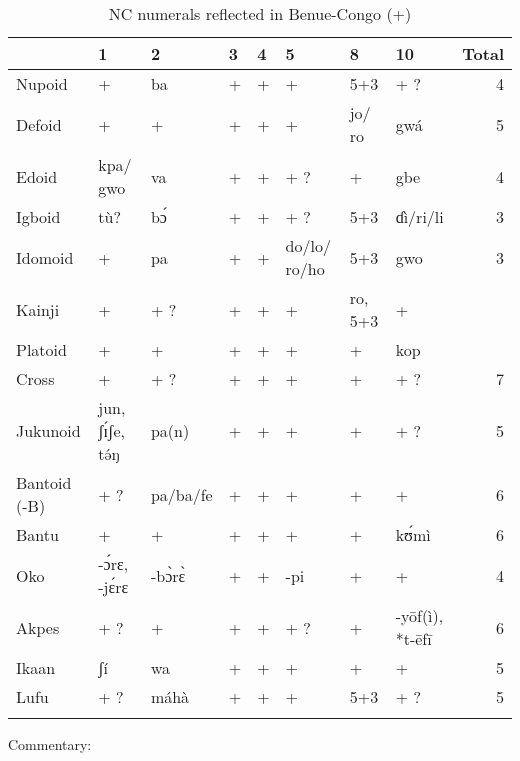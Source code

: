 \begin{table}
\caption{\label{tab:5:1}NC numerals reflected in Benue-Congo (+)}
\begin{tabularx}{\textwidth}{l QlllQlQr}
\lsptoprule
& {1} & {2} & {3} & {4} & {5} & {8} & {10} & {Total}\\
\midrule
Nupoid & {+} & {ba} & {+} & {+} & {+} & {5+3} & {+} ? & {4}\\
Defoid & {+} & {+} & {+} & {+} & {+} & {jo/} {ro} & {gwá} & {5}\\
Edoid & {kpa/} {gwo} & {va} & {+} & {+} & {+} ? & {+} & {gbe} & {4}\\
Igboid & {tù?} & {b{\'{ɔ}}} & {+} & {+} & {+} ? & {5+3} & {ɗì/ri/li} & {\color{lsMidBlue}3}\\
Idomoid & {+} & {pa} & {+} & {+} & {do/lo/ ro/ho} & {5+3} & {gwo} & {\color{lsMidBlue}3}\\
Kainji & {+} & {+} ? & {+} & {+} & {+} & {ro,} {5+3} & {+} & \color{lsLightWine}{6}\\
Platoid & {+} & {+} & {+} & {+} & {+} & {+} & {kop} & \color{lsLightWine}{6}\\
Cross & {+} & {+} ? & {+} & {+} & {+} & {+} & {+} ? &\color{lsLightWine} {7}\\
Jukunoid & {jun,} {ʃ{\'{ɪ}}ʃe,}  {t{\'{ə}}ŋ} & {pa(n)} & {+} & {+} & {+} & {+} & {+} ? & {5}\\
Bantoid (-B) & {+} ? & {pa/ba/fe} & {+} & {+} & {+} & {+} & {+} &\color{lsLightWine} {6}\\
Bantu & {+} & {+} & {+} & {+} & {+} & {+} & {k{\'{ʊ}}mì} &\color{lsLightWine} {6}\\
Oko & {-{\'{ɔ}}rɛ, -j{\'{ɛ}}rɛ} & {-b{\`{ɔ}}r{\`{ɛ}}} & {+} & {+} & {-pi} & {+} & {+} & {4}\\
Akpes & {+} ? & {+} & {+} & {+} & {+} ? & {+} & {-y{\={o}}f(ì), *t-{\={e}}fī} &\color{lsLightWine} {6}\\
Ikaan & {ʃí} & {wa} & {+} & {+} & {+} & {+} & {+} & {5}\\
Lufu & {+} ? & {máhà} & {+} & {+} & {+} & {5+3} & {+} ? & {5}\\
\lspbottomrule
\end{tabularx}
\end{table}
Commentary:

